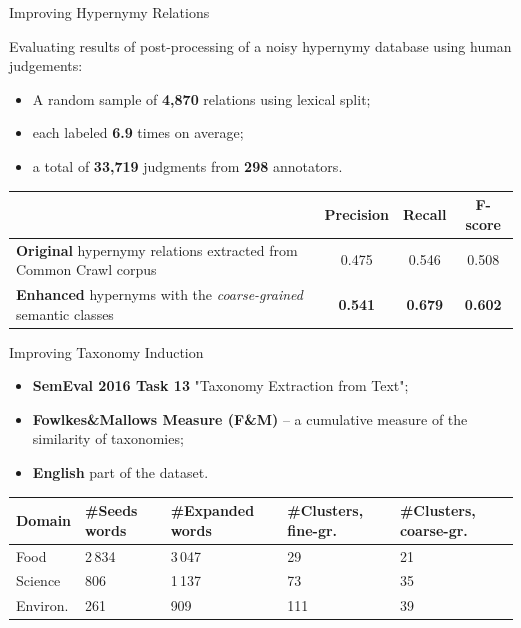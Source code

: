 \documentclass[usenames,dvipsnames]{beamer}
\begin{document}
\begin{frame}{ Improving Hypernymy Relations }

Evaluating results of post-processing of a noisy hypernymy database using human judgements:


\begin{itemize}
	\item A random sample of \textbf{4,870} relations using lexical split; 
	\item each labeled \textbf{6.9} times on average;
	\item a total of \textbf{33,719} judgments from \textbf{298} annotators.
\end{itemize}

\pause 

\begin{table}
\footnotesize
\centering

\begin{tabular}{p{6cm}|c|c|c}
 & \textbf{Precision} & \textbf{Recall} & \textbf{F-score} \\ \toprule
\textbf{\alert{Original}} hypernymy relations extracted from Common Crawl corpus~\cite{seitner2016large} & 0.475 & 0.546 & 0.508 \\ \midrule 
\textbf{\alert{Enhanced}} hypernyms with the \textit{coarse-grained} semantic classes   & \textbf{0.541} & \textbf{0.679} & \textbf{0.602} \\ 
\end{tabular}

\end{table}

\end{frame}


\begin{frame}{ Improving Taxonomy Induction }

\begin{itemize}
	\item \textbf{SemEval 2016 Task 13} "Taxonomy Extraction from Text";
	\item \textbf{Fowlkes\&Mallows Measure (F\&M)} -- a cumulative measure of the similarity of taxonomies;
	\item \textbf{English} part of the dataset.
\end{itemize}

\pause 



\begin{table}
\footnotesize
\centering
\begin{tabular}{l|p{0.9cm}|p{1.4cm}|p{1.3cm}|p{1.5cm}}
\textbf{Domain} & \textbf{\#Seeds words} & \textbf{\#Expanded words} & \textbf{\#Clusters}, fine-gr. & \textbf{\#Clusters}, coarse-gr.  \\ \toprule
Food & 2\,834 & 3\,047 & 29 & 21 \\
Science & 806 & 1\,137 & 73 & 35 \\
Environ. & 261 & 909 & 111 & 39 \\
\end{tabular}
\end{table}


\end{frame}
\end{document}
